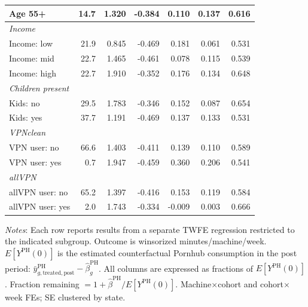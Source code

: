 \begin{landscape}
\begin{table}[htbp]
\begin{tabular}{lrr rrrr}
Age 55+ & 14.7 & 1.320 & -0.384 & 0.110 & 0.137 & 0.616 \\
\midrule
\multicolumn{7}{l}{\textit{Income}} \\
Income: low & 21.9 & 0.845 & -0.469 & 0.181 & 0.061 & 0.531 \\
Income: mid & 22.7 & 1.465 & -0.461 & 0.078 & 0.115 & 0.539 \\
Income: high & 22.7 & 1.910 & -0.352 & 0.176 & 0.134 & 0.648 \\
\midrule
\multicolumn{7}{l}{\textit{Children present}} \\
Kids: no & 29.5 & 1.783 & -0.346 & 0.152 & 0.087 & 0.654 \\
Kids: yes & 37.7 & 1.191 & -0.469 & 0.137 & 0.133 & 0.531 \\
\midrule
\multicolumn{7}{l}{\textit{VPNclean}} \\
VPN user: no & 66.6 & 1.403 & -0.411 & 0.139 & 0.110 & 0.589 \\
VPN user: yes & 0.7 & 1.947 & -0.459 & 0.360 & 0.206 & 0.541 \\
\midrule
\multicolumn{7}{l}{\textit{allVPN}} \\
allVPN user: no & 65.2 & 1.397 & -0.416 & 0.153 & 0.119 & 0.584 \\
allVPN user: yes & 2.0 & 1.743 & -0.334 & -0.009 & 0.003 & 0.666 \\
\bottomrule
\end{tabular}
\vspace{4pt}
\begin{minipage}{\linewidth}\footnotesize
\textit{Notes}: Each row reports results from a separate TWFE regression restricted to the indicated subgroup. Outcome is winsorized minutes/machine/week. $E[Y^{\text{PH}}(0)]$ is the estimated counterfactual Pornhub consumption in the post period: $\bar{y}^{\text{PH}}_{g,\text{treated},\text{post}} - \hat{\beta}^{\text{PH}}_g$. All columns are expressed as fractions of $E[Y^{\text{PH}}(0)]$. Fraction remaining $= 1 + \hat{\beta}^{\text{PH}}/E[Y^{\text{PH}}(0)]$. Machine$\times$cohort and cohort$\times$week FEs; SE clustered by state.
\end{minipage}
\end{table}
\end{landscape}
